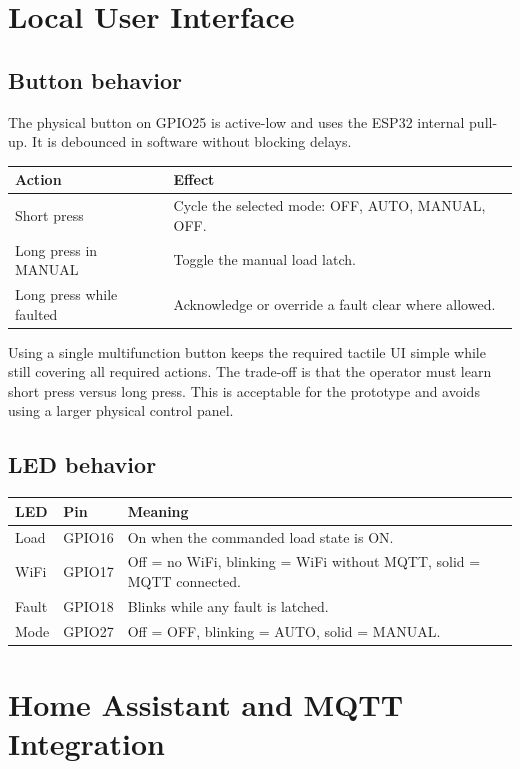 \documentclass[12pt,a4paper]{article}
\begin{document}
\newpage
\section{Local User Interface}

\subsection{Button behavior}

The physical button on GPIO25 is active-low and uses the ESP32 internal pull-up.
It is debounced in software without blocking delays.

\begin{tabularx}{\textwidth}{p{}X}
\toprule
Action & Effect\\
\midrule
Short press & Cycle the selected mode: OFF, AUTO, MANUAL, OFF.\\
Long press in MANUAL & Toggle the manual load latch.\\
Long press while faulted & Acknowledge or override a fault clear where allowed.\\
\bottomrule
\end{tabularx}

Using a single multifunction button keeps the required tactile UI simple while
still covering all required actions. The trade-off is that the operator must learn
short press versus long press. This is acceptable for the prototype and avoids
using a larger physical control panel.

\subsection{LED behavior}

\begin{tabularx}{\textwidth}{p{}p{}X}
\toprule
LED & Pin & Meaning\\
\midrule
Load & GPIO16 & On when the commanded load state is ON.\\
WiFi & GPIO17 & Off = no WiFi, blinking = WiFi without MQTT, solid = MQTT
connected.\\
Fault & GPIO18 & Blinks while any fault is latched.\\
Mode & GPIO27 & Off = OFF, blinking = AUTO, solid = MANUAL.\\
\bottomrule
\end{tabularx}

\newpage
\section{Home Assistant and MQTT Integration}
\end{document}
